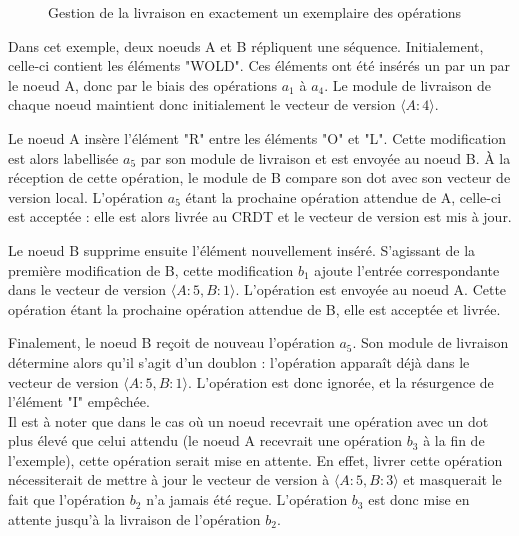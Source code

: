 \begin{figure}[!ht]
{\begin{minipage}{\linewidth}
{
        \label{fig:exactly-once-delivery-sync}
      }
      \end{minipage}
    }
  \caption{Gestion de la livraison en exactement un exemplaire des opérations}
  \label{fig:exactly-once-delivery}
\end{figure}

Dans cet exemple, deux noeuds A et B répliquent une séquence.
Initialement, celle-ci contient les éléments "WOLD".
Ces éléments ont été insérés un par un par le noeud A, donc par le biais des opérations $a_1$ à $a_4$.
Le module de livraison de chaque noeud maintient donc initialement le vecteur de version $\langle A:4 \rangle$.

Le noeud A insère l'élément "R" entre les éléments "O" et "L".
Cette modification est alors labellisée $a_5$ par son module de livraison et est envoyée au noeud B.
À la réception de cette opération, le module de B compare son dot avec son vecteur de version local.
L'opération $a_5$ étant la prochaine opération attendue de A, celle-ci est acceptée : elle est alors livrée au \ac{CRDT} et le vecteur de version est mis à jour.

Le noeud B supprime ensuite l'élément nouvellement inséré.
S'agissant de la première modification de B, cette modification $b_1$ ajoute l'entrée correspondante dans le vecteur de version $\langle A:5, B:1 \rangle$.
L'opération est envoyée au noeud A.
Cette opération étant la prochaine opération attendue de B, elle est acceptée et livrée.

Finalement, le noeud B reçoit de nouveau l'opération $a_5$.
Son module de livraison détermine alors qu'il s'agit d'un doublon : l'opération apparaît déjà dans le vecteur de version $\langle A:5, B:1 \rangle$.
L'opération est donc ignorée, et la résurgence de l'élément "I" empêchée.\\

Il est à noter que dans le cas où un noeud recevrait une opération avec un dot plus élevé que celui attendu (\eg le noeud A recevrait une opération $b_3$ à la fin de l'exemple), cette opération serait mise en attente.
En effet, livrer cette opération nécessiterait de mettre à jour le vecteur de version à $\langle A:5,B:3 \rangle$ et masquerait le fait que l'opération $b_2$ n'a jamais été reçue.
L'opération $b_3$ est donc mise en attente jusqu'à la livraison de l'opération $b_2$.

